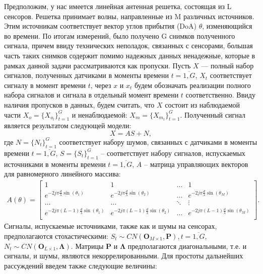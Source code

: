 \documentclass[11pt]{article}
\begin{document}
\begin{center}
\fontsize{20}{23}\selectfont {}
\end{center}
\begin{center}
\fontsize{16}{20}\selectfont {}
\end{center}
Предположим, у нас имеется линейная антенная решетка, состоящая из L сенсоров. Решетка принимает волны, направленные из M различных источников. Этим источникам соответствует вектор углов прибытия (DoA) $\theta$, изменяющийся во времени. По итогам измерений, было получено G снимков полученного сигнала, причем ввиду технических неполадок, связанных с сенсорами, большая часть таких снимков содержит помимо надежных данных ненадежные, которые в рамках данной задачи рассматриваются как пропуски. Пусть $X$ --- полный набор сигналов, полученных датчиками в моменты времени $t=\overline{1,G}$, $X_t$ соответствует сигналу в момент времени $t$, через $x$ и $x_t$ будем обозначать реализации полного набора сигналов и сигнала в отдельный момент времени $t$  соответственно. Ввиду наличия пропусков в данных, будем считать, что $X$ состоит из наблюдаемой части $X_o = \{X_{o_t}\}_{t=1}^G$ и ненаблюдаемой: $X_m = \{X_{m_t}\}_{t=1}^G$. Полученный сигнал является результатом следующей модели:
\begin{equation}
X = A S + N,
\end{equation}
где $N=\{N_t\}_{t=1}^G$ соответствует набору шумов, связанных с датчиками в моменты времени $t=\overline{1,G}$, $S=\{S_t\}_{t=1}^G$ -- соответствует набору сигналов, испускаемых источниками в моменты времени $t=\overline{1,G}$, $A$ -- матрица управляющих векторов для равномерного линейного массива:
\begin{gather}
A(\theta) = \begin{bmatrix}
1&1&\dots&1\\
e^{-2j\pi \frac{d}{\lambda}\sin(\theta_1)}& e^{-2j\pi \frac{d}{\lambda}\sin(\theta_2)}&\dots&e^{-2j\pi \frac{d}{\lambda}\sin(\theta_M)}\\
\dots&\dots&\ddots&\vdots\\
e^{-2j\pi (L-1) \frac{d}{\lambda}\sin(\theta_1)}& e^{-2j\pi (L-1) \frac{d}{\lambda}\sin(\theta_2)}&\dots&e^{-2j\pi (L-1) \frac{d}{\lambda}\sin(\theta_M)}\\
\end{bmatrix}.
\nonumber
\end{gather}
Сигналы, испускаемые источниками, также как и шумы на сенсорах, предполагаются стохастическими: $S_t \sim CN(\mathbf{O}_{M \times 1},\mathbf{P}),t=\overline{1,G}$, $N_t \sim CN(\mathbf{O}_{L \times 1}, \mathbf{\Lambda})$. Матрицы $\mathbf{P}$ и $\mathbf{\Lambda}$ предполагаются диагональными, т.е. и сигналы, и шумы, являются некоррелированными. Для простоты дальнейших рассуждений введем также следующие величины:
\end{document}
